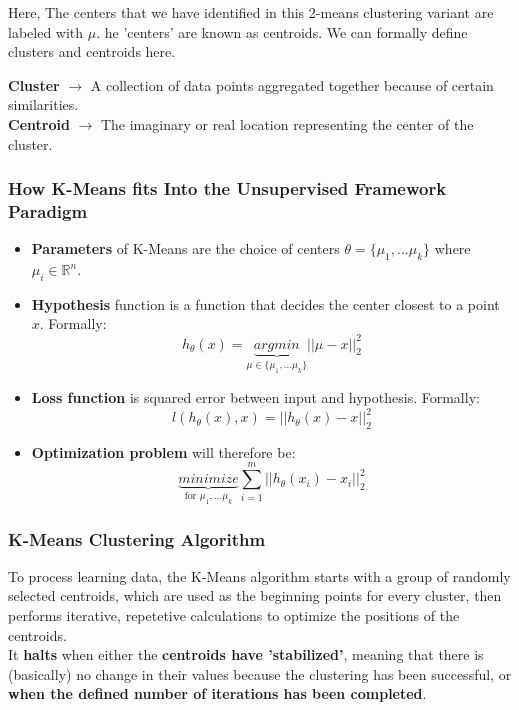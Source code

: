 \documentclass[english, 10pt]{article}
\begin{document}
\hfill \break Here, The centers that we have identified in this 2-means clustering variant are labeled with $\mu$. he 'centers' are known as centroids. We can formally define clusters and centroids here.

\hfill \begin{tcolorbox}[title=Definition:,colframe=red!75!black,colback=red!5!white,arc=0pt,fonttitle=\bfseries]
\textbf{Cluster} $\rightarrow$ A collection of data points aggregated together because of certain similarities.\\
\textbf{Centroid} $\rightarrow$ The imaginary or real location representing the center of the cluster.
\end{tcolorbox}



\subsubsection{How K-Means fits Into the Unsupervised Framework Paradigm}

\begin{itemize}
	\item \textbf{Parameters} of K-Means are the choice of centers $\theta = \{\mu_1, ... \mu_k\}$ where $\mu_i \in \mathbb{R}^n$.
	\item \textbf{Hypothesis} function is a function that decides the center closest to a point $x$. Formally: $$ h_{\theta}(x)= \underbrace{argmin}_{\mu \in \{\mu_1, ... \mu_k\}} ||\mu -x||_2^2 $$
	\item \textbf{Loss function} is squared error between input and hypothesis. Formally: $$l(h_{\theta}(x),x)=||h_{\theta}(x)-x||_2^2$$
	\item \textbf{Optimization problem} will therefore be: $$ \underbrace{minimize}_{\text{for } \mu_1, ... \mu_k} \sum_{i=1}^{m}{||h_{\theta}(x_i)-x_i||_2^2}$$
\end{itemize}

\subsubsection{K-Means Clustering Algorithm}

To process learning data, the K-Means algorithm starts with a group of randomly selected centroids, which are used as the beginning points for every cluster, then performs iterative, repetetive calculations to optimize the positions of the centroids.\\

It \textbf{halts} when either the \textbf{centroids have 'stabilized'}, meaning that there is (basically) no change in their values because the clustering has been successful, or \textbf{when the defined number of iterations has been completed}.
\end{document}
